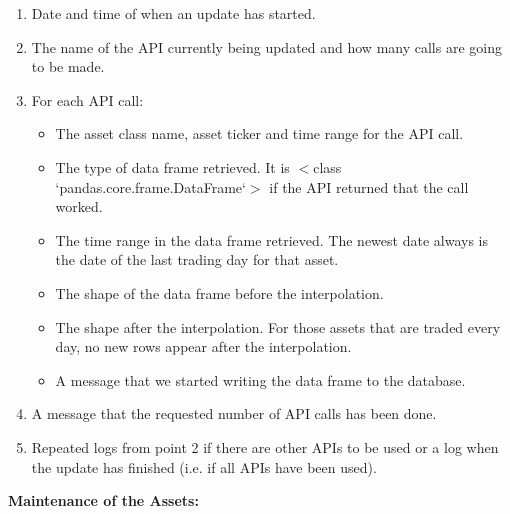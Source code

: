 \documentclass[main.tex]{subfiles}
\begin{document}
\begin{enumerate}
    \item Date and time of when an update has started.
    \item The name of the API currently being updated and how many calls are going to be made.
    \item For each API call: 
        \begin{itemize}
        \item The asset class name, asset ticker and time range for the API call.
        \item The type of data frame retrieved.  It is $<$class `pandas.core.frame.DataFrame`$>$ if the API returned that the call worked.
        \item The time range in the data frame retrieved. The newest date always is the date of the last trading day for that asset.
        \item The shape of the data frame before the interpolation.
        \item The shape after the interpolation. For those assets that are traded every day, no new rows appear after the interpolation.
        \item A message that we started writing the data frame to the database.
    \end{itemize}
    \item A message that the requested number of API calls has been done.
    \item Repeated logs from point 2 if there are other APIs to be used or a log when the update has finished (i.e. if all APIs have been used).
\end{enumerate}

\textbf{Maintenance of the Assets:}
\end{document}

